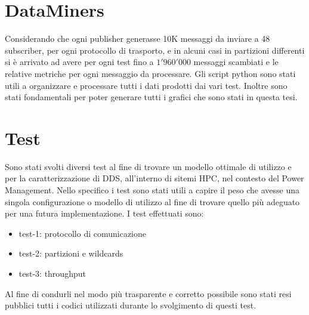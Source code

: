 




\section{DataMiners}
Considerando che ogni publisher generasse 10K messaggi da inviare a 48 subscriber, per ogni protocollo di trasporto, e in alcuni casi in partizioni differenti si è arrivato ad avere per ogni test fino a $1'960'000$ messaggi scambiati e le relative metriche per ogni messaggio da processare. 
Gli script python sono stati utili a organizzare e processare tutti i dati prodotti dai vari test. Inoltre sono stati fondamentali per poter generare tutti i grafici che sono stati in questa tesi.



\section{Test}
Sono stati svolti diversi test al fine di trovare un modello ottimale di utilizzo e per la caratterizzazione di DDS, all'interno di sitemi HPC, nel contesto del Power Management. Nello specifico i test sono stati utili a capire il peso che avesse una singola configurazione o modello di utilizzo al fine di trovare quello più adeguato per una futura implementazione. I test effettuati sono:

\begin{itemize}
    \item test-1: protocollo di comunicazione
    \item test-2: partizioni e wildcards
    \item test-3: throughput
\end{itemize}


Al fine di condurli nel modo più trasparente e corretto possibile sono stati resi pubblici \cite{mygit} tutti i codici utilizzati durante lo svolgimento di questi test. %


